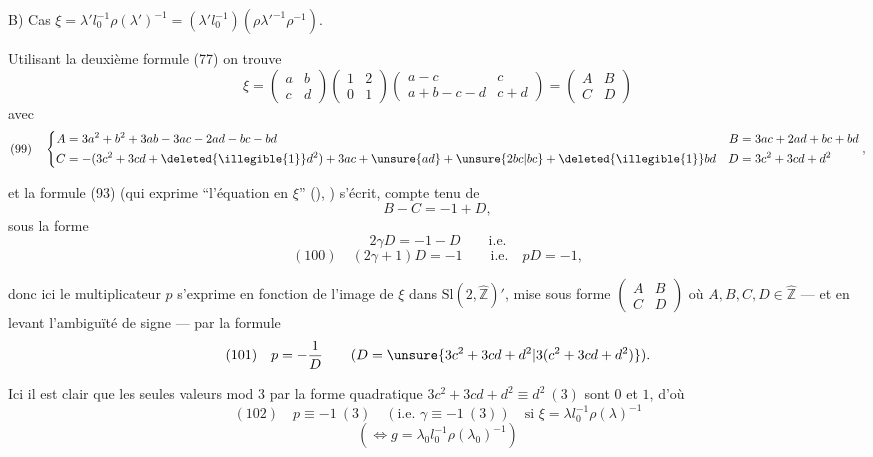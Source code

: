 B) Cas $\xi=\lambda'l_0^{-1}\rho(\lambda')^{-1}=(\lambda'l_0^{-1})(\rho\lambda'^{-1}\rho^{-1})$.

Utilisant la deuxième formule (77) on trouve
\[
\xi=\begin{pmatrix}a&b\\c&d\end{pmatrix}
\begin{pmatrix}1&2\\0&1\end{pmatrix}
\begin{pmatrix}a-c&c\\a+b-c-d&c+d\end{pmatrix}
=\begin{pmatrix}A&B\\C&D\end{pmatrix}
\]
avec
\[
(99)\quad
\left\{\begin{aligned}
A&=3a^2+b^2+3ab-3ac-2ad-bc-bd
& B&=3ac+2ad+bc+bd\\
C&=-(3c^2+3cd+\deleted{\illegible{1}}d^2)+3ac+\unsure{ad}+\unsure{2bc|bc}+\deleted{\illegible{1}}bd
& D&=3c^2+3cd+d^2
\end{aligned}\right.,
\]

et la formule (93) (qui exprime ``l'équation en $\xi$'' (\unsure{**}), ) s'écrit,  compte tenu de
\[
B-C=-1+D,
\]
sous la forme 
\[
2\gamma D=-1-D\qquad\text{i.e.}
\]
\[
(100)\quad \boxed{(2\gamma+1)D=-1\qquad\text{i.e.}\quad pD=-1},
\]

donc ici le multiplicateur $p$ s'exprime en fonction de l'image de $\xi$ dans $\mathrm{Sl}(2,\widehat{\mathbb Z})'$, mise sous forme $\begin{pmatrix}A&B\\C&D\end{pmatrix}$ où $A,B,C,D\in\widehat{\mathbb Z}$ --- et en levant l'ambiguïté de signe  --- par la formule
\[
(101)\quad p=-\frac1D\qquad(D=\unsure{3c^2+3cd+d^2|3(c^2+3cd+d^2)}).
\]


Ici il est clair que les seules valeurs mod $3$  par la forme quadratique $3c^2+3cd+d^2\equiv d^2\ (3)$ sont $0$ et $1$, d'où
\[
(102)\quad p\equiv-1\ (3)\quad(\text{i.e. }\gamma\equiv-1\ (3))\quad\text{si }\xi=\lambda l_0^{-1}\rho(\lambda)^{-1}
\]
\[
(\Longleftrightarrow g=\lambda_0l_0^{-1}\rho(\lambda_0)^{-1})
\]

